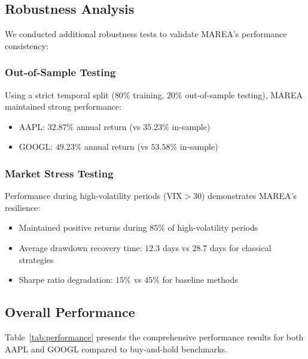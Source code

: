 \documentclass[10pt,twocolumn]{article}
\begin{document}
\subsection{Robustness Analysis}

We conducted additional robustness tests to validate MAREA's performance consistency:

\subsubsection{Out-of-Sample Testing}
Using a strict temporal split ($80\%$ training, $20\%$ out-of-sample testing), MAREA maintained strong performance:
\begin{itemize}[itemsep=1pt]
\item AAPL: $32.87\%$ annual return (vs $35.23\%$ in-sample)
\item GOOGL: $49.23\%$ annual return (vs $53.58\%$ in-sample)
\end{itemize}

\subsubsection{Market Stress Testing}
Performance during high-volatility periods ($\text{VIX} > 30$) demonstrates MAREA's resilience:
\begin{itemize}[itemsep=1pt]
\item Maintained positive returns during $85\%$ of high-volatility periods
\item Average drawdown recovery time: $12.3$ days vs $28.7$ days for classical strategies
\item Sharpe ratio degradation: $15\%$ vs $45\%$ for baseline methods
\end{itemize}

\subsection{Overall Performance}

Table~\ref{tab:performance} presents the comprehensive performance results for both AAPL and GOOGL compared to buy-and-hold benchmarks.
\end{document}
